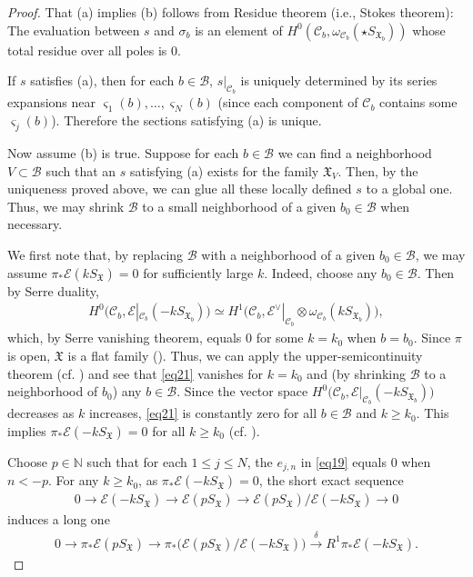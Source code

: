 \documentclass[12pt,a4paper,notitlepage]{article}
\theoremstyle{definition}
\theoremstyle{plain}
\newcommand{\fk}{\mathfrak}
\newcommand{\mc}{\mathcal}
\newcommand{\scr}{\mathscr}
\newcommand{\sgm}{\varsigma}
\newcommand{\SX}{{S_{\fk X}}}
\numberwithin{equation}{section}
\begin{document}
\begin{proof}
That (a) implies (b) follows from Residue theorem (i.e., Stokes theorem): The evaluation between $s$ and $\sigma_b$ is an element of $H^0(\mc C_b,\omega_{\mc C_b}(\star S_{\fk X_b}))$ whose total residue over all poles is $0$.
	
If $s$ satisfies (a), then for each $b\in\mc B$, $s|_{\mc C_b}$ is uniquely determined by its series expansions near $\sgm_1(b),\dots,\sgm_N(b)$ (since each component of $\mc C_b$ contains some $\sgm_j(b)$). Therefore the sections satisfying (a) is unique.
	
Now assume (b) is true.  Suppose for each $b\in\mc B$ we can find a neighborhood $V\subset\mc B$ such that an $s$ satisfying (a) exists for the family $\fk X_V$. Then, by the uniqueness proved above, we can glue all these locally defined $s$ to a global one. Thus, we may shrink $\mc B$ to a small neighborhood of a given $b_0\in\mc B$ when necessary. 

We first note that, by replacing $\mc B$ with a neighborhood of a given $b_0\in\mc B$, we may assume $\pi_*\scr E(k\SX)=0$ for sufficiently large $k$. Indeed, choose any $b_0\in\mc B$. Then by Serre duality,
\begin{align}
H^0\big(\mc C_b,\scr E|_{\mc C_b}(-kS_{\fk X_b})\big)\simeq H^1\big(\mc C_b,\scr E^\vee|_{\mc C_b}\otimes\omega_{\mc C_b}(kS_{\fk X_b})\big),	\label{eq21}
\end{align}
which, by Serre vanishing theorem, equals $0$ for some $k=k_0$ when $b=b_0$. Since $\pi$ is open, $\fk X$ is a flat family (\cite[Sec. 3.20]{Fis76}). Thus, we can apply the upper-semicontinuity theorem (cf. \cite[Thm. III.4.12]{BS76}) and see that \eqref{eq21} vanishes for $k=k_0$ and (by shrinking $\mc B$ to a neighborhood of $b_0$) any $b\in\mc B$. Since the vector space $H^0\big(\mc C_b,\scr E|_{\mc C_b}(-kS_{\fk X_b})\big)$ decreases as $k$ increases, \eqref{eq21} is constantly zero for all $b\in\mc B$ and $k\geq k_0$. This implies $\pi_*\scr E(-k\SX)=0$ for all $k\geq k_0$ (cf. \cite[Cor. III.3.5]{BS76}).
	
Choose $p\in\mathbb N$ such that for each $1\leq j\leq N$, the $e_{j,n}$ in \eqref{eq19} equals $0$ when $n<-p$. For any $k\geq k_0$, as $\pi_*\scr E(-k\SX)=0$, the short exact sequence
\begin{align*}
0\rightarrow \scr E(-k\SX)\rightarrow \scr E(p\SX)\rightarrow \scr E(p\SX)/\scr E(-k\SX)\rightarrow 0
\end{align*}
induces a long one
\begin{align}
0\rightarrow\pi_*\scr E(p\SX)\rightarrow \pi_*\big(\scr E(p\SX)/\scr E(-k\SX)\big)\xrightarrow{\delta}R^1\pi_*\scr E(-k\SX).\label{eq22}
\end{align}



\end{proof}
\end{document}
